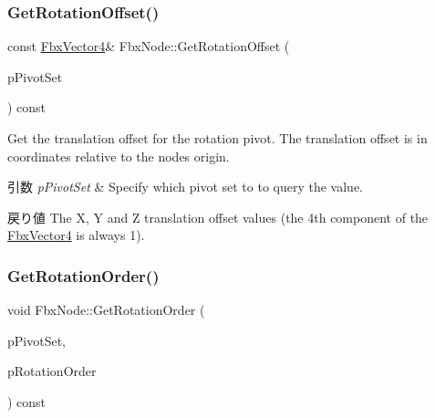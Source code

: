 \mbox{\label{class_fbx_node_ad234dda15a2a724fde3ecd723d5e8585}} 
\subsubsection{\texorpdfstring{Get\+Rotation\+Offset()}{GetRotationOffset()}}
{\footnotesize\ttfamily const \hyperlink{class_fbx_vector4}{Fbx\+Vector4}\& Fbx\+Node\+::\+Get\+Rotation\+Offset (\begin{DoxyParamCaption}\item[{\hyperlink{class_fbx_node_ae62b7311ac4727654cdf1ebd5cbf7343}{E\+Pivot\+Set}}]{p\+Pivot\+Set }\end{DoxyParamCaption}) const}

Get the translation offset for the rotation pivot. The translation offset is in coordinates relative to the node\textquotesingle{}s origin. 
\begin{DoxyParams}{引数}
{\em p\+Pivot\+Set} & Specify which pivot set to to query the value. \\
\hline
\end{DoxyParams}
\begin{DoxyReturn}{戻り値}
The X, Y and Z translation offset values (the 4th component of the \hyperlink{class_fbx_vector4}{Fbx\+Vector4} is always 1). 
\end{DoxyReturn}
\mbox{\label{class_fbx_node_a7f9a892ce7689d2a99c445bb989ff1e6}} 
\subsubsection{\texorpdfstring{Get\+Rotation\+Order()}{GetRotationOrder()}}
{\footnotesize\ttfamily void Fbx\+Node\+::\+Get\+Rotation\+Order (\begin{DoxyParamCaption}\item[{\hyperlink{class_fbx_node_ae62b7311ac4727654cdf1ebd5cbf7343}{E\+Pivot\+Set}}]{p\+Pivot\+Set,  }\item[{\hyperlink{fbxmath_8h_ae46778666b56bb0abe5992b855fe9332}{E\+Fbx\+Rotation\+Order} \&}]{p\+Rotation\+Order }\end{DoxyParamCaption}) const}

